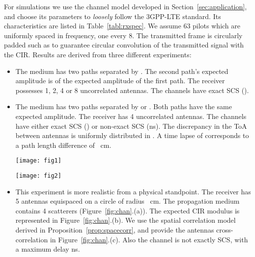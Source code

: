 \documentclass[journal,10pt]{IEEEtran}
\providecommand{\xp}[1]{\textsf{Exp.~{#1}}\ }
\begin{document}
For simulations we use the channel model developed in Section~\ref{sec:application}, and choose its parameters to \emph{loosely} follow the 3GPP-LTE standard. Its characteristics are listed in Table~\ref{tabl:rxspec}. We assume 63 pilots which are uniformly spaced in frequency, one every 8.  The transmitted frame is circularly padded such as to guarantee circular convolution of the transmitted signal with the CIR. 
Results are derived from three different experiments:
\begin{itemize}
\item[\textsf A] The medium has two paths separated by . The second path's expected amplitude is  of the expected amplitude of the first path. The receiver possesses 1, 2, 4 or 8 uncorrelated antennas. The channels have exact SCS ().
\item[\textsf B] The medium has two paths separated by  or . Both paths have the same expected amplitude. The receiver has 4 uncorrelated antennas. The channels have either exact SCS () or non-exact SCS (ns). The discrepancy in the ToA between antennas is uniformly distributed in . A time lapse of  corresponds to a path length difference of ~cm. 

\begin{figure*}[ht!]
  \centering
\texttt{[image: fig1]}
\caption{ (\xp A) For the same global input SNR, a system with more antennas estimates the ToAs more accurately and is more resilient to noise. This is a consequence of the increased receiver diversity. The second path has  the amplitude of the first path and is thus quickly buried into noise as SNR decreases. The estimation reaches the Cram\'er-Rao bound as long as it correctly identifies the path.}
\label{fig:fig1}\end{figure*}

\begin{figure*}[ht!]
  \centering
\texttt{[image: fig2]}
\caption{ (\xp A) Part (a) shows the performances of Block ESPRIT-TLS with or without Block Cadzow denoising. In this setup, the gain obtained with the denoising is relatively small and is achieved after one iteration. Part (b) shows the performances of Block Prony-TLS with or without Block Cadzow denoising. As expected, the performance of Prony's algorithm without denoising is very poor. After 3 denoising iterations, performances of Block Prony-TLS and Block ESPRIT-TLS are indistinguishable.
}
\label{fig:fig2}
\end{figure*}



\item[\textsf C] This experiment is more realistic from a physical standpoint. The receiver has 5 antennas equispaced on a circle of radius ~cm. The propagation medium contains 4 scatterers (Figure~\ref{fig:chan}.(a)). The expected CIR modulus is represented in Figure~\ref{fig:chan}.(b).  We use the spatial correlation model derived in Proposition~\ref{prop:spacecorr}, and provide the antennas cross-correlation in Figure~\ref{fig:chan}.(c). Also the channel is not exactly SCS, with a maximum delay ns.
\end{itemize}
\end{document}
